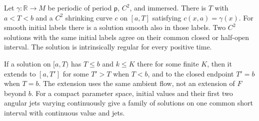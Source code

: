\begin{theorem}
\label{thm:ramps-local}
Let $\gamma:\mathbb R\to M$ be periodic of period $\mathsf p$, $C^2$, and
immersed.  There is $T$ with $a<T<b$ and a $C^2$ shrinking curve $c$ on
$[a,T]$ satisfying $c(x,a)=\gamma(x)$.  For smooth initial labels there is
a solution smooth also in those labels.  Two $C^2$ solutions with the same initial labels agree
on their common closed or half-open interval.  The solution is intrinsically
regular for every positive time.

If a solution on $[a,T)$ has $T\leq b$ and $k\leq K$ there for some finite
$K$, then it extends to $[a,T']$ for some $T'>T$ when $T<b$, and to the
closed endpoint $T'=b$ when $T=b$.  The extension uses the same ambient flow,
not an extension of $F$ beyond $b$.  For a compact parameter space, initial
values and their first two angular jets varying continuously give a family
of solutions on one common short interval with continuous value and jets.
\end{theorem}
